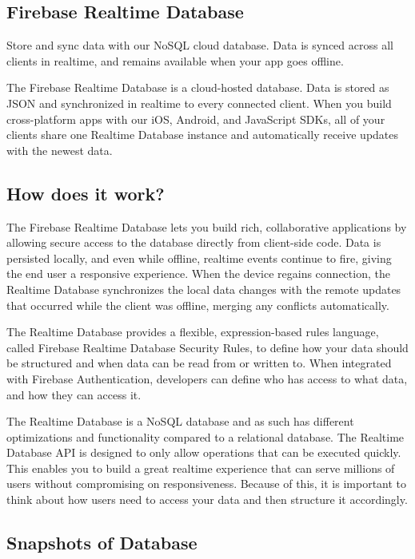 \subsection{Firebase Realtime Database}
Store and sync data with our NoSQL cloud database. Data is synced across all clients in realtime, and remains available when your app goes offline.

The Firebase Realtime Database is a cloud-hosted database. Data is stored as JSON and synchronized in realtime to every connected client. When you build cross-platform apps with our iOS, Android, and JavaScript SDKs, all of your clients share one Realtime Database instance and automatically receive updates with the newest data.
\subsection{How does it work?}
The Firebase Realtime Database lets you build rich, collaborative applications by allowing secure access to the database directly from client-side code. Data is persisted locally, and even while offline, realtime events continue to fire, giving the end user a responsive experience. When the device regains connection, the Realtime Database synchronizes the local data changes with the remote updates that occurred while the client was offline, merging any conflicts automatically.

The Realtime Database provides a flexible, expression-based rules language, called Firebase Realtime Database Security Rules, to define how your data should be structured and when data can be read from or written to. When integrated with Firebase Authentication, developers can define who has access to what data, and how they can access it.

The Realtime Database is a NoSQL database and as such has different optimizations and functionality compared to a relational database. The Realtime Database API is designed to only allow operations that can be executed quickly. This enables you to build a great realtime experience that can serve millions of users without compromising on responsiveness. Because of this, it is important to think about how users need to access your data and then structure it accordingly.



\subsection{Snapshots of Database}


